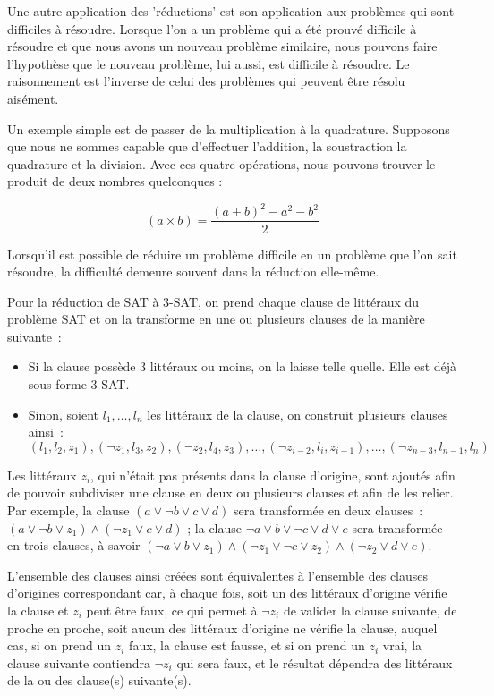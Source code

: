 \documentclass{article}
\begin{document}
Une autre application des 'réductions' est son application aux problèmes qui sont difficiles à résoudre. Lorsque l'on a un problème qui a été prouvé difficile à résoudre et que nous avons un nouveau problème similaire, nous pouvons faire l'hypothèse que le nouveau problème, lui aussi, est difficile à résoudre. Le raisonnement est l'inverse de celui des problèmes qui peuvent être résolu aisément. 

Un exemple simple est de passer de la multiplication à la quadrature. Supposons que nous ne sommes capable que d'effectuer l'addition, la soustraction la quadrature et la division. Avec ces quatre opérations, nous pouvons trouver le produit de deux nombres quelconques :


$$(a \times b) = \dfrac{(a + b)^2 - a^2 - b^2}{2}$$


Lorsqu'il est possible de réduire un problème difficile en un problème que l'on sait résoudre, la difficulté demeure souvent dans la réduction elle-même.

Pour la réduction de SAT à 3-SAT, on prend chaque clause de littéraux du problème SAT et on la transforme en une ou plusieurs clauses de la manière suivante~:

\begin{itemize}
\item Si la clause possède 3 littéraux ou moins, on la laisse telle quelle. Elle est déjà sous forme 3-SAT.
\item Sinon, soient $l_1, \dots, l_n$ les littéraux de la clause, on construit plusieurs clauses ainsi~:
$$
(l_1, l_2, z_1), (\lnot z_1, l_3, z_2), (\lnot z_2, l_4, z_3), \dots, (\lnot z_{i-2}, l_{i}, z_{i-1}), \dots, (\lnot z_{n-3}, l_{n-1}, l_{n})
$$
\end{itemize}

Les littéraux $z_i$, qui n'était pas présents dans la clause d'origine, sont ajoutés afin de pouvoir subdiviser une clause en deux ou
plusieurs clauses et afin de les relier. Par exemple, la clause $(a \vee \lnot b \vee c \vee d)$ sera transformée en deux clauses~: $(a
\vee \lnot b \vee z_1) \wedge (\lnot z_1 \vee c \vee d)$ ; la clause ${\lnot a \vee b \vee \lnot c \vee d \vee e}$ sera transformée en trois
clauses, à savoir $(\lnot a \vee b \vee z_1) \wedge (\lnot z_1 \vee \lnot c \vee z_2) \wedge (\lnot z_2 \vee d \vee e)$.

L'ensemble des clauses ainsi créées sont équivalentes à l'ensemble des clauses d'origines correspondant car, à chaque fois, soit un des littéraux d'origine vérifie la clause et $z_i$ peut être faux, ce qui permet à $\lnot z_i$ de valider la clause suivante, de proche en proche, soit aucun des littéraux d'origine ne vérifie la clause, auquel cas, si on prend un $z_i$ faux, la clause est fausse, et si on prend un $z_i$ vrai, la clause suivante 
contiendra $\lnot z_i$ qui sera faux, et le résultat dépendra des littéraux de la ou des clause(s) suivante(s).
\end{document}
